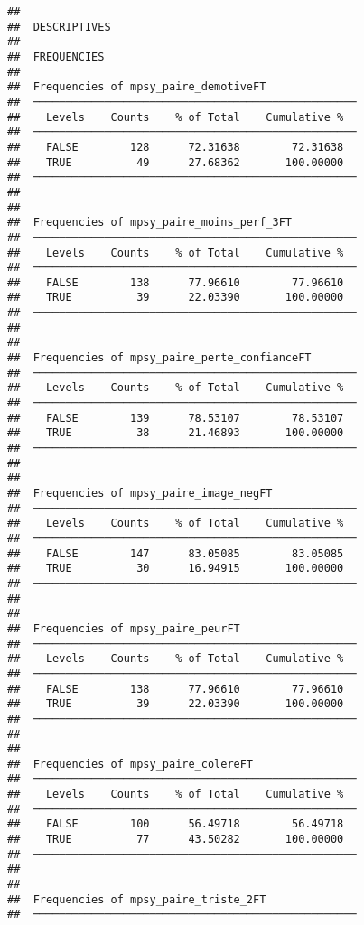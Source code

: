 \documentclass[
]{article}
\begin{document}
\begin{verbatim}
## 
##  DESCRIPTIVES
## 
##  FREQUENCIES
## 
##  Frequencies of mpsy_paire_demotiveFT               
##  ────────────────────────────────────────────────── 
##    Levels    Counts    % of Total    Cumulative %   
##  ────────────────────────────────────────────────── 
##    FALSE        128      72.31638        72.31638   
##    TRUE          49      27.68362       100.00000   
##  ────────────────────────────────────────────────── 
## 
## 
##  Frequencies of mpsy_paire_moins_perf_3FT           
##  ────────────────────────────────────────────────── 
##    Levels    Counts    % of Total    Cumulative %   
##  ────────────────────────────────────────────────── 
##    FALSE        138      77.96610        77.96610   
##    TRUE          39      22.03390       100.00000   
##  ────────────────────────────────────────────────── 
## 
## 
##  Frequencies of mpsy_paire_perte_confianceFT        
##  ────────────────────────────────────────────────── 
##    Levels    Counts    % of Total    Cumulative %   
##  ────────────────────────────────────────────────── 
##    FALSE        139      78.53107        78.53107   
##    TRUE          38      21.46893       100.00000   
##  ────────────────────────────────────────────────── 
## 
## 
##  Frequencies of mpsy_paire_image_negFT              
##  ────────────────────────────────────────────────── 
##    Levels    Counts    % of Total    Cumulative %   
##  ────────────────────────────────────────────────── 
##    FALSE        147      83.05085        83.05085   
##    TRUE          30      16.94915       100.00000   
##  ────────────────────────────────────────────────── 
## 
## 
##  Frequencies of mpsy_paire_peurFT                   
##  ────────────────────────────────────────────────── 
##    Levels    Counts    % of Total    Cumulative %   
##  ────────────────────────────────────────────────── 
##    FALSE        138      77.96610        77.96610   
##    TRUE          39      22.03390       100.00000   
##  ────────────────────────────────────────────────── 
## 
## 
##  Frequencies of mpsy_paire_colereFT                 
##  ────────────────────────────────────────────────── 
##    Levels    Counts    % of Total    Cumulative %   
##  ────────────────────────────────────────────────── 
##    FALSE        100      56.49718        56.49718   
##    TRUE          77      43.50282       100.00000   
##  ────────────────────────────────────────────────── 
## 
## 
##  Frequencies of mpsy_paire_triste_2FT               
##  ────────────────────────────────────────────────── 

\end{verbatim}
\end{document}
